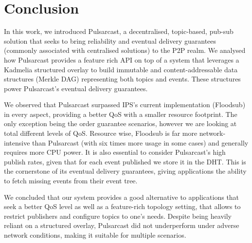 
\section{Conclusion}
\label{section:conclusion}

In this work, we introduced Pulsarcast, a decentralised, topic-based, pub-sub
solution that seeks to bring reliability and eventual delivery guarantees
(commonly associated with centralised solutions) to the P2P realm. We analysed
how Pulsarcast provides a feature rich API on top of a system that leverages a
Kadmelia structured overlay to build immutable and content-addressable data
structures (Merkle DAG) representing both topics and events. These structures
power Pulsarcast's eventual delivery guarantees.

We observed that Pulsarcast surpassed IPS's current implementation (Floodsub)
in every aspect, providing a better QoS with a smaller resource
footprint. The only exception being the order guarantee scenarios, however we
are looking at total different levels of QoS. Resource wise, Floodsub is far
more network-intensive than Pulsarcast (with six times more usage in some
cases) and generally requires more CPU power.  It is also essential to consider
Pulsarcast's high publish rates, given that for each event published we store
it in the DHT. This is the cornerstone of its eventual delivery guarantees,
giving applications the ability to fetch missing events from their event tree.

We concluded that our system provides a good alternative to applications that
seek a better QoS level as well as a feature-rich topology setting, that allows
to restrict publishers and configure topics to one's needs. Despite being
heavily reliant on a structured overlay, Pulsarcast did not underperform under
adverse network conditions, making it suitable for multiple scenarios. 
